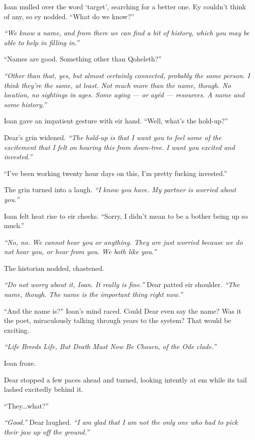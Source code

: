 Ioan mulled over the word `target', searching for a better one. Ey couldn't think of any, so ey nodded. ``What do we know?''

\emph{``We know a name, and from there we can find a bit of history, which you may be able to help in filling in.''}

``Names are good. Something other than Qoheleth?''

\emph{``Other than that, yes, but almost certainly connected, probably the same person. I think they're the same, at least. Not much more than the name, though. No location, no sightings in ages. Some aging — or agéd — resources. A name and some history.''}

Ioan gave an impatient gesture with eir hand. ``Well, what's the hold-up?''

Dear's grin widened. \emph{``The hold-up is that I want you to feel some of the excitement that I felt on hearing this from down-tree. I want you excited and invested.''}

``I've been working twenty hour days on this, I'm pretty fucking invested.''

The grin turned into a laugh. \emph{``I know you have. My partner is worried about you.''}

Ioan felt heat rise to eir cheeks. ``Sorry, I didn't mean to be a bother being up so much.''

\emph{``No, no. We cannot hear you or anything. They are just worried because we do not hear you, or hear from you. We both like you.''}

The historian nodded, chastened.

\emph{``Do not worry about it, Ioan. It really is fine.''} Dear patted eir shoulder. \emph{``The name, though. The name is the important thing right now.''}

``And the name is?'' Ioan's mind raced. Could Dear even say the name? Was it the poet, miraculously talking through years to the system? That would be exciting.

\emph{``Life Breeds Life, But Death Must Now Be Chosen, of the Ode clade.''}

Ioan froze.

Dear stopped a few paces ahead and turned, looking intently at em while its tail lashed excitedly behind it.

``They\ldots{}what?''

\emph{``Good.''} Dear laughed. \emph{``I am glad that I am not the only one who had to pick their jaw up off the ground.''}

